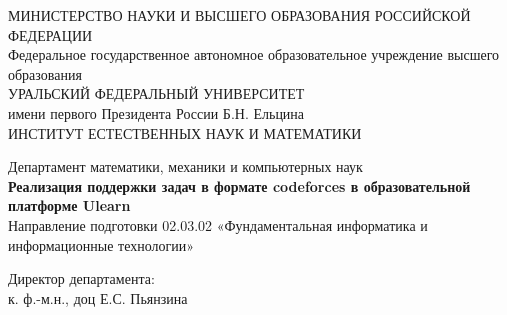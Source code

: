 





\begin{titlepage}
\clearpage\maketitle
\thispagestyle{empty}

\begin{centering}
    {
    МИНИСТЕРСТВО НАУКИ И ВЫСШЕГО ОБРАЗОВАНИЯ РОССИЙСКОЙ ФЕДЕРАЦИИ\\
    Федеральное государственное автономное образовательное учреждение
    высшего образования\\
    УРАЛЬСКИЙ ФЕДЕРАЛЬНЫЙ УНИВЕРСИТЕТ\\
    имени первого Президента России Б.Н. Ельцина\\ \vspace{0.5cm}
    ИНСТИТУТ ЕСТЕСТВЕННЫХ НАУК И МАТЕМАТИКИ \\}
    
\vfill
{
  Департамент математики, механики и компьютерных наук\\
\bigskip\bigskip
  \textbf{Реализация поддержки задач в формате codeforces в образовательной платформе Ulearn
  \\}
\bigskip
  {Направление подготовки 02.03.02 «Фундаментальная информатика и информационные технологии»}
\\ 	\vspace{0.5cm}
}
\vfill

\begin{minipage}[t]{.50\textwidth}
Директор департамента:\\
к. ф.-м.н., доц Е.С. Пьянзина \bigskip

\underline{\hspace{5.5cm}}\\


\end{minipage}
\end{centering}
\end{titlepage}
